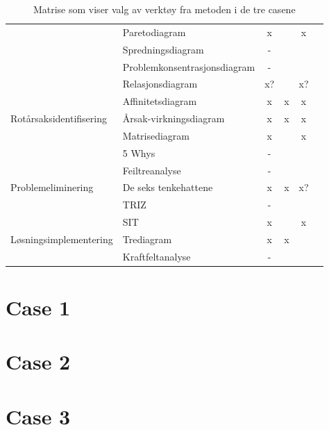 \begin{table}[htbp]
\begin{tabular}{|l|l|c|r|r|r|}
\cline{2-6}          & Paretodiagram & x     &       & \multicolumn{1}{c|}{x} &  \\
\cline{2-6}          & Spredningsdiagram & -     &       &       &  \\
\cline{2-6}          & Problemkonsentrasjonsdiagram & -     &       &       &  \\
\cline{2-6}          & Relasjonsdiagram & x?    &       & \multicolumn{1}{c|}{x?} &  \\
\cline{2-6}          & Affinitetsdiagram & x     & \multicolumn{1}{c|}{x} & \multicolumn{1}{c|}{x} &  \\
    \hline
    \multicolumn{1}{|l|}{\multirow{4}[8]{*}{Rotårsaksidentifisering}} & Årsak-virkningsdiagram & x     & \multicolumn{1}{c|}{x} & \multicolumn{1}{c|}{x} &  \\
\cline{2-6}          & Matrisediagram & x     &       & \multicolumn{1}{c|}{x} &  \\
\cline{2-6}          & 5 Whys & -     &       &       &  \\
\cline{2-6}          & Feiltreanalyse & -     &       &       &  \\
    \hline
    \multicolumn{1}{|l|}{\multirow{3}[6]{*}{Problemeliminering}} & De seks tenkehattene & x     & \multicolumn{1}{c|}{x} & \multicolumn{1}{c|}{x?} &  \\
\cline{2-6}          & TRIZ  & -     &       &       &  \\
\cline{2-6}          & SIT   & x     &       & \multicolumn{1}{c|}{x} &  \\
    \hline
    \multicolumn{1}{|l|}{\multirow{2}[4]{*}{Løsningsimplementering}} & Trediagram & x     & \multicolumn{1}{c|}{x} &       &  \\
\cline{2-6}          & Kraftfeltanalyse & -     &       &       &  \\
    \hline
    \end{tabular}%
  \caption{Matrise som viser valg av verktøy fra metoden i de tre casene}
  \label{tab:verktoymatrise}%
\end{table}%


\section{Case 1}

\section{Case 2}

\section{Case 3}
